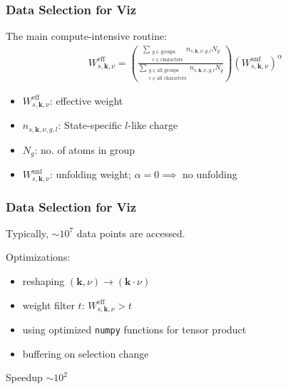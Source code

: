 \begin{frame}\frametitle{Data Selection for Viz}    
    The main compute-intensive routine:
    \begin{align*}
      W^{\text{eff}}_{s,\mathbf{k},\nu} = \left( \frac{\sum\limits_{\substack{g \in \text{groups} \\ c \in \text{characters}}} n_{s,\mathbf{k},\nu,g,l} N_g}{\sum\limits_{\substack{g \in \text{all groups} \\ c \in \text{all characters}}} n_{s,\mathbf{k},\nu,g,l} N_g} \right) \left(W_{s,\mathbf{k},\nu}^{\text{unf}}\right)^\alpha
    \end{align*}
    \vspace{1em}
    \begin{itemize}
    \item<2-> \(W^{\text{eff}}_{s,\mathbf{k},\nu}\): effective weight
    \item<3-> \(n_{s,\mathbf{k},\nu,g,l}\): State-specific \(l\)-like charge
    \item<4-> \(N_g\): no. of atoms in group         
    \item<5-> \(W_{s,\mathbf{k},\nu}^{\text{unf}}\): unfolding weight; \(\alpha = 0
        \implies \) no unfolding
    \end{itemize}

    
\end{frame}
% 

\begin{frame}
    \frametitle{Data Selection for Viz}
    Typically, \(\sim 10^7\) data points are accessed.
    \pause
    \vspace{2em}
     
    Optimizations:
    \pause
    \begin{itemize}
    \item reshaping \((\mathbf{k},\nu) \rightarrow (\mathbf{k} \cdot \nu)\)
        \pause
    \item weight filter \(t\): \(W^{\text{eff}}_{s,\mathbf{k},\nu} > t\)
        \pause
    \item using optimized \texttt{numpy} functions for tensor product
        \pause
    \item buffering on selection change
    \end{itemize}
    \pause 
    \faArrowRight{} Speedup \(\sim 10^2\)
\end{frame}

